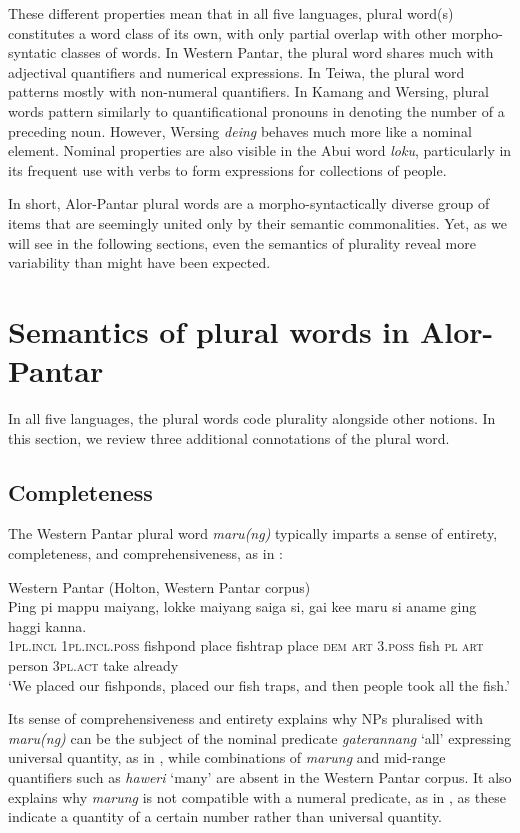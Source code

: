  These different properties mean that in all five languages, plural word(s) constitutes a word class of its own, with only partial overlap with other morpho-syntatic classes of words. In Western Pantar, the plural word shares much with adjectival quantifiers and numerical expressions. In Teiwa, the plural word patterns mostly with non-numeral quantifiers. In Kamang and Wersing, plural words pattern similarly to quantificational pronouns in denoting the number of a preceding noun. However, Wersing \textit{deing} behaves much more like a nominal element. Nominal properties are also visible in the Abui word \textit{loku}, particularly in its frequent use with verbs to form expressions for collections of people.

 In short, Alor-Pantar plural words are a morpho-syntactically diverse group of items that are seemingly united only by their semantic commonalities. Yet, as we will see in the following sections, even the semantics of plurality reveal more variability than might have been expected.

\section{Semantics of plural words in Alor-Pantar}  %
\label{sec:9:4}
In all five languages, the plural words code plurality alongside other notions. In this section, we review three additional connotations of the plural word.

\subsection{Completeness} %
\label{sec:9:4.1}
The Western Pantar plural word \textit{maru(ng)} typically imparts a sense of entirety, completeness, and comprehensiveness, as in :


\ea%
\label{ex:9:65}
Western Pantar (Holton, Western Pantar corpus)\\
\gll  Ping pi mappu maiyang, lokke maiyang saiga si, gai ke{{\textglotstop}}{e} maru si aname ging haggi kanna. \\
    \textsc{1pl.incl}  \textsc{1pl.incl.poss} fishpond place fishtrap place \textsc{dem} \textsc{art}  \textsc{3.poss} fish \textsc{pl} \textsc{art} person \textsc{3pl.act} take already \\
\glt `We placed our fishponds, placed our fish traps,  and then people took all the fish.'
\z


Its sense of comprehensiveness and entirety explains why NPs pluralised with \textit{maru(ng)} can be the subject of the nominal predicate \textit{gaterannang} `all' expressing universal quantity, as in , while combinations of \textit{marung} and mid-range quantifiers such as \textit{haweri} `many' are absent in the Western Pantar corpus. It also explains why \textit{marung} is not compatible with a numeral predicate, as in , as these indicate a quantity of a certain number rather than universal quantity.


